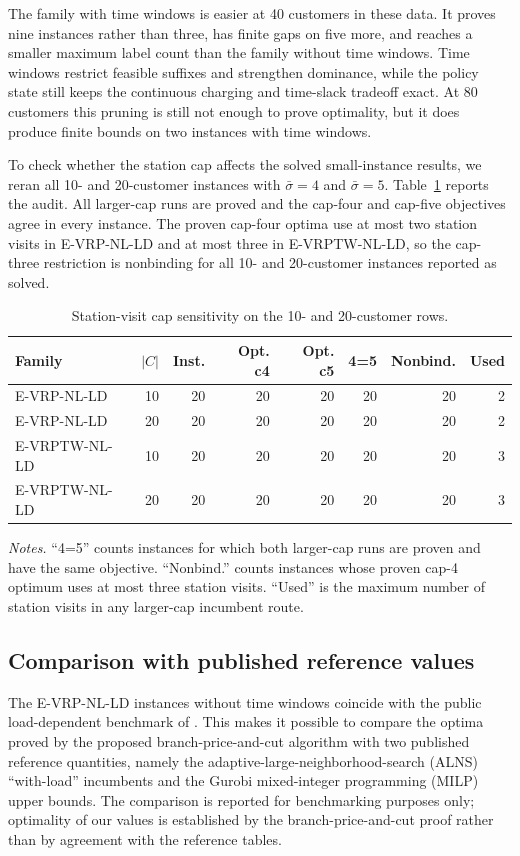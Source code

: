 \documentclass[review,3p,authoryear]{elsarticle}
\theoremstyle{plain}
\theoremstyle{definition}
\theoremstyle{remark}
\begin{document}
The family with time windows is easier at 40 customers in
these data. It proves nine instances rather than three, has finite gaps on five more,
and reaches a smaller maximum label count than the family without time windows.
Time windows restrict feasible suffixes and strengthen dominance, while the
policy state still keeps the continuous charging and time-slack tradeoff exact.
At 80 customers this pruning is still not enough to prove optimality, but it does
produce finite bounds on two instances with time windows.

To check whether the station cap affects the solved small-instance results, we
reran all 10- and 20-customer instances with \(\bar\sigma=4\) and
\(\bar\sigma=5\). Table~\ref{tab:cap-sensitivity} reports the audit. All larger-cap
runs are proved and the cap-four and cap-five objectives agree in every instance.
The proven cap-four optima use at most two station visits in E-VRP-NL-LD and at
most three in E-VRPTW-NL-LD, so the cap-three restriction is nonbinding for all
10- and 20-customer instances reported as solved.

\begin{table}[!ht]
\centering
\caption{Station-visit cap sensitivity on the 10- and 20-customer rows.}
\label{tab:cap-sensitivity}
\begin{tabular}{lrrrrrrr}
\toprule
Family & $|C|$ & Inst. & Opt. c4 & Opt. c5 & 4=5 & Nonbind. & Used \\
\midrule
E-VRP-NL-LD & 10 & 20 & 20 & 20 & 20 & 20 & 2 \\
E-VRP-NL-LD & 20 & 20 & 20 & 20 & 20 & 20 & 2 \\
E-VRPTW-NL-LD & 10 & 20 & 20 & 20 & 20 & 20 & 3 \\
E-VRPTW-NL-LD & 20 & 20 & 20 & 20 & 20 & 20 & 3 \\
\bottomrule
\end{tabular}
\vspace{2pt}
\begin{minipage}{0.98\linewidth}
\small
\emph{Notes.} ``4=5'' counts instances for which both larger-cap runs are proven
and have the same objective. ``Nonbind.'' counts instances whose proven cap-4
optimum uses at most three station visits. ``Used'' is the maximum number of
station visits in any larger-cap incumbent route.
\end{minipage}
\end{table}


\subsection{Comparison with published reference values}
\label{sec:reference}
The E-VRP-NL-LD instances without time windows coincide with the public
load-dependent benchmark of \citet{KancharlaRamadurai2020}. This makes it possible
to compare the optima proved by the proposed branch-price-and-cut algorithm with
two published reference quantities, namely the adaptive-large-neighborhood-search (ALNS)
``with-load'' incumbents and the Gurobi mixed-integer programming (MILP) upper
bounds. The comparison is reported for benchmarking purposes only; optimality of
our values is established by the branch-price-and-cut proof rather than by
agreement with the reference tables.
\end{document}
